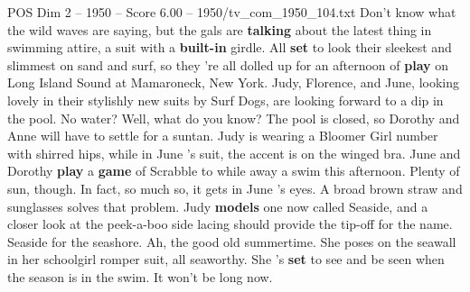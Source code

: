 \begin{textsample}{POS Dim 2 – 1950 – Score 6.00 – 1950/tv\_com\_1950\_104.txt}  \label{ex:f2_pos_003}
Don't know what the wild waves are saying, but the gals are \textbf{talking} about the latest thing in swimming attire, a suit with a \textbf{built-in} girdle.
All \textbf{set} to look their sleekest and slimmest on sand and surf, so they 're all dolled up for an afternoon of \textbf{play} on Long Island Sound at Mamaroneck, New York.
Judy, Florence, and June, looking lovely in their stylishly new suits by Surf Dogs, are looking forward to a dip in the pool.
No water?
Well, what do you know?
The pool is closed, so Dorothy and Anne will have to settle for a suntan.
Judy is wearing a Bloomer Girl number with shirred hips, while in June 's suit, the accent is on the winged bra.
June and Dorothy \textbf{play} a \textbf{game} of Scrabble to while away a swim this afternoon.
Plenty of sun, though.
In fact, so much so, it gets in June 's eyes.
A broad brown straw and sunglasses solves that problem.
Judy \textbf{models} one now called Seaside, and a closer look at the peek-a-boo side lacing should provide the tip-off for the name.
Seaside for the seashore.
Ah, the good old summertime.
She poses on the seawall in her schoolgirl romper suit, all seaworthy.
She 's \textbf{set} to see and be seen when the season is in the swim.
It won't be long now.

\end{textsample}
